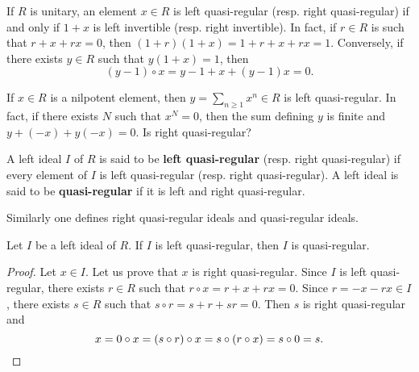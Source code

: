 If $R$ is unitary, an element $x\in R$ is left quasi-regular (resp. right quasi-regular)
if and only if $1+x$ is left invertible (resp. right invertible). In fact, 
if $r\in R$ is such that $r+x+rx=0$, then $(1+r)(1+x)=1+r+x+rx=1$.
Conversely, if there exists $y\in R$ such that $y(1+x)=1$, then  
\[
(y-1)\circ x=y-1+x+(y-1)x=0.
\]

\begin{example}
	If $x\in R$ is a nilpotent element, 
    then $y=\sum_{n\geq1}x^n\in R$ is left quasi-regular. 
	In fact, if there exists $N$ such that $x^N=0$, 
    then the sum defining $y$ is finite 
    and $y+(-x)+y(-x)=0$.  Is right quasi-regular?
\end{example}

\begin{definition}
A left ideal $I$ of $R$ is said to be 
\textbf{left quasi-regular} (resp. right quasi-regular) if every element of $I$ is
left quasi-regular (resp. right quasi-regular). A left ideal 
is said to be \textbf{quasi-regular} if it is left and right quasi-regular. 
\end{definition}

Similarly 
one defines right quasi-regular ideals and quasi-regular ideals. 

\begin{lemma}
	\label{lemma:casiregular}
	Let $I$ be a left ideal of $R$. If $I$ is left quasi-regular, then 
	$I$ is quasi-regular.
\end{lemma}

\begin{proof}
	Let $x\in I$. Let us prove that $x$ is right quasi-regular. Since $I$ is
	left quasi-regular, there exists $r\in R$ such that $r\circ x=r+x+rx=0$. Since 
	$r=-x-rx\in I$, there exists $s\in R$ such that $s\circ
	r=s+r+sr=0$. Then $s$ is right quasi-regular and  
	\[
	x=0\circ x=(s\circ r)\circ x=s\circ (r\circ x)=s\circ 0=s.\qedhere
	\]
\end{proof}

